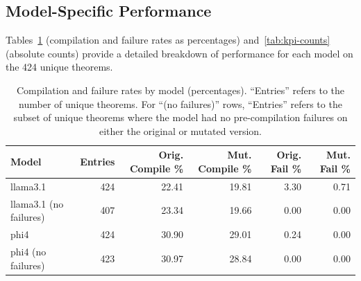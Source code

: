 \subsection{Model-Specific Performance}
\label{sec:results_model_specific}

Tables~\ref{tab:kpi-percentages} (compilation and failure rates as percentages) and~\ref{tab:kpi-counts} (absolute counts) provide a detailed breakdown of performance for each model on the 424 unique theorems.

\begin{table}[h]
\centering
\begin{tabular}{|l|r|r|r|r|r|}
\hline
\textbf{Model} & \textbf{Entries} & \textbf{Orig. Compile \%} & \textbf{Mut. Compile \%} & \textbf{Orig. Fail \%} & \textbf{Mut. Fail \%} \\
\hline
llama3.1 & 424 & 22.41 & 19.81 & 3.30 & 0.71 \\
llama3.1 (no failures) & 407& 23.34 & 19.66 & 0.00 & 0.00 \\
\hline
phi4 & 424 & 30.90 & 29.01 & 0.24 & 0.00 \\
phi4 (no failures) & 423 & 30.97 & 28.84 & 0.00 & 0.00 \\
\hline
\end{tabular}
\caption{Compilation and failure rates by model (percentages). ``Entries'' refers to the number of unique theorems. For ``(no failures)'' rows, ``Entries'' refers to the subset of unique theorems where the model had no pre-compilation failures on either the original or mutated version.}
\label{tab:kpi-percentages}
\end{table}


